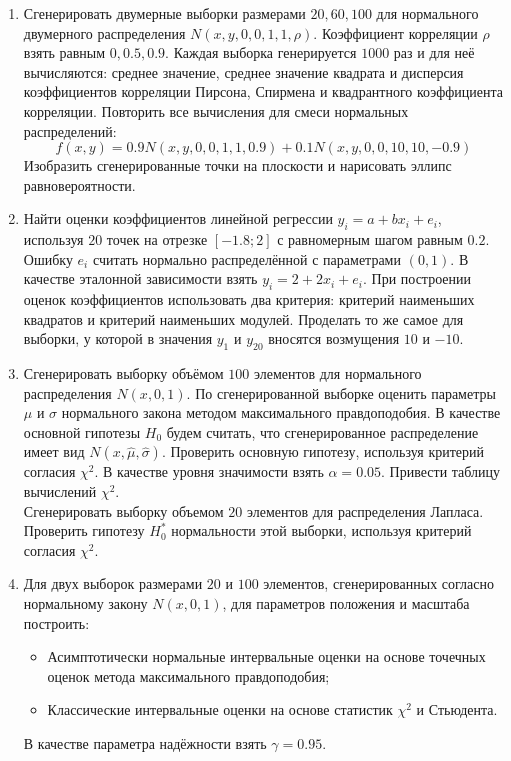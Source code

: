 \documentclass[../body.tex]{subfiles}
\begin{document}
	\begin{enumerate}
		\item Сгенерировать двумерные выборки размерами $20, 60, 100$ для нормального двумерного распределения $N(x,y,0,0,1,1,\rho)$. Коэффициент корреляции $\rho$ взять равным $0, 0.5, 0.9.$ Каждая выборка генерируется $1000$ раз и для неё вычисляются: среднее значение, среднее значение квадрата и дисперсия коэффициентов корреляции Пирсона, Спирмена и квадрантного коэффициента корреляции. Повторить все вычисления для смеси нормальных распределений:
		$$
		f(x,y) = 0.9N(x,y,0,0,1,1,0.9) + 0.1N(x,y,0,0,10,10,−0.9)
		$$
		Изобразить сгенерированные точки на плоскости и нарисовать эллипс равновероятности.
		\item Найти оценки коэффициентов линейной регрессии $y_{i} = a + bx_{i} + e_{i}$, используя $20$ точек на отрезке $[-1.8; 2]$ с равномерным шагом равным $0.2$. Ошибку $e_{i}$ считать нормально распределённой с параметрами $(0, 1)$. В качестве эталонной зависимости взять $y_{i} = 2 + 2x_{i} + e_{i}$. При построении оценок коэффициентов использовать два критерия: критерий наименьших квадратов и критерий наименьших модулей. Проделать то же самое для выборки, у которой в значения $y_{1}$ и $y_{20}$ вносятся возмущения $10$ и $-10$.
		\item 	Сгенерировать выборку объёмом $100$ элементов для нормального распределения $N(x,0,1).$ По сгенерированной выборке оценить параметры $\mu$ и $\sigma$ нормального закона методом максимального правдоподобия. В качестве основной гипотезы $H_{0}$ будем считать, что сгенерированное распределение имеет вид $N(x,\hat{\mu}, \hat{\sigma})$. Проверить основную гипотезу, используя критерий согласия $\chi^{2}$. В качестве уровня значимости взять $\alpha = 0.05$. Привести таблицу вычислений $\chi^{2}$. \\
		Сгенерировать выборку объемом $20$ элементов для распределения Лапласа. Проверить гипотезу $H_0^*$ нормальности этой выборки, используя критерий согласия $\chi^{2}$.
		\item Для двух выборок размерами $20$ и $100$ элементов, сгенерированных согласно нормальному закону $N(x,0,1)$, для параметров положения и масштаба построить:
		\begin{itemize}
			\item Асимптотически нормальные интервальные оценки на основе точечных оценок метода максимального правдоподобия;
			\item Классические интервальные оценки на основе статистик $\chi^{2}$ и Стьюдента.
		\end{itemize}
		В качестве параметра надёжности взять $\gamma = 0.95$.
	\end{enumerate}
	
\end{document}
